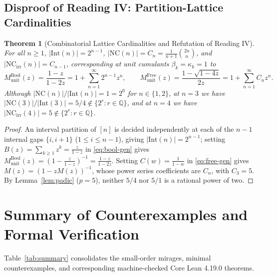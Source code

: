 \documentclass[11pt,a4paper]{article}
\newtheorem{theorem}{Theorem}[section]
\theoremstyle{definition}
\theoremstyle{remark}
\newcommand{\NC}{\mathrm{NC}}
\newcommand{\NCirr}{\mathrm{NC}_{\mathrm{irr}}}
\newcommand{\IntP}{\mathrm{Int}}
\begin{document}
\subsection{Disproof of Reading IV: Partition-Lattice Cardinalities}

\begin{theorem}[Combinatorial Lattice Cardinalities and Refutation of Reading IV]\label{thm:reading4}
For all $n \ge 1$, $|\IntP(n)| = 2^{n-1}$, $|\NC(n)| = C_n = \frac{1}{n+1}\binom{2n}{n}$, and $|\NCirr(n)| = C_{n-1}$, corresponding at unit cumulants $\beta_k = \kappa_k = 1$ to
\[
  M_{\mathrm{unit}}^{\mathrm{Bool}}(z) = \frac{1 - z}{1 - 2z} = 1 + \sum_{n=1}^{\infty} 2^{n-1} z^n, \qquad
  M_{\mathrm{unit}}^{\mathrm{Free}}(z) = \frac{1 - \sqrt{1 - 4z}}{2z} = 1 + \sum_{n=1}^{\infty} C_n z^n.
\]
Although $|\NC(n)|/|\IntP(n)| = 1 = 2^0$ for $n \in \{1, 2\}$, at $n = 3$ we have $|\NC(3)|/|\IntP(3)| = 5/4 \notin \{2^r : r \in \mathbb{Q}\}$, and at $n = 4$ we have $|\NCirr(4)| = 5 \notin \{2^r : r \in \mathbb{Q}\}$.
\end{theorem}

\begin{proof}
An interval partition of $[n]$ is decided independently at each of the $n-1$ internal gaps $\{i, i+1\}$ ($1 \le i \le n-1$), giving $|\IntP(n)| = 2^{n-1}$; setting $B(z) = \sum_{k \ge 1} z^k = \frac{z}{1-z}$ in \eqref{eq:bool-gen} gives $M_{\mathrm{unit}}^{\mathrm{Bool}}(z) = (1 - \frac{z}{1-z})^{-1} = \frac{1-z}{1-2z}$. Setting $C(w) = \frac{1}{1-w}$ in \eqref{eq:free-gen} gives $M(z) = (1 - z M(z))^{-1}$, whose power series coefficients are $C_n$, with $C_3 = 5$. By Lemma~\ref{lem:padic} ($p = 5$), neither $5/4$ nor $5/1$ is a rational power of two.
\end{proof}

\section{Summary of Counterexamples and Formal Verification}

Table~\ref{tab:summary} consolidates the small-order mirages, minimal counterexamples, and corresponding machine-checked Core Lean 4.19.0 theorems.
\end{document}

